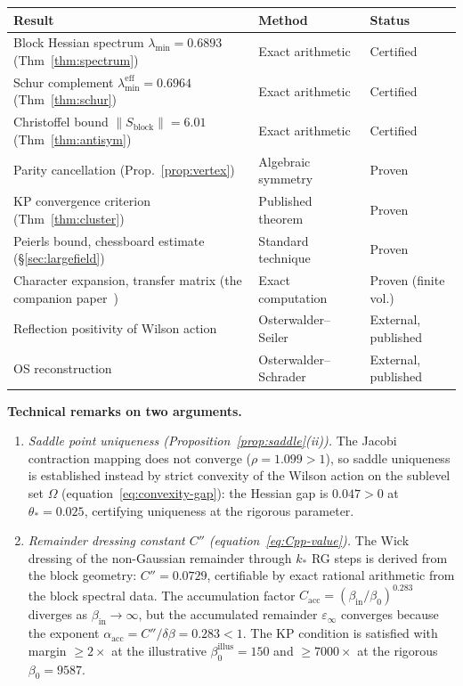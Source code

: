 \documentclass[11pt]{article}
\theoremstyle{definition}
\begin{document}
\begin{center}
\renewcommand{\arraystretch}{1.15}
\begin{tabular}{p{5.5cm}p{3cm}p{5cm}}
\toprule
\textbf{Result} & \textbf{Method} & \textbf{Status}\\
\midrule
Block Hessian spectrum
$\lambda_{\min}=0.6893$ (Thm~\ref{thm:spectrum})
& Exact arithmetic & Certified\\
Schur complement
$\lambda_{\min}^{\mathrm{eff}}=0.6964$ (Thm~\ref{thm:schur})
& Exact arithmetic & Certified\\
Christoffel bound
$\|S_{\mathrm{block}}\|=6.01$ (Thm~\ref{thm:antisym})
& Exact arithmetic & Certified\\
Parity cancellation
(Prop.~\ref{prop:vertex})
& Algebraic symmetry & Proven\\
KP convergence criterion
(Thm~\ref{thm:cluster})
& Published theorem & Proven\\
Peierls bound, chessboard estimate
(\S\ref{sec:largefield})
& Standard technique & Proven\\
Character expansion, transfer matrix
(the companion paper~\cite{companion})
& Exact computation & Proven (finite vol.)\\
Reflection positivity of Wilson action
& Osterwalder--Seiler~\cite{OS78} & External, published\\
OS reconstruction
& Osterwalder--Schrader~\cite{OS73} & External, published\\
\bottomrule
\end{tabular}
\end{center}

\medskip\noindent\textbf{Technical remarks on two arguments.}

\begin{enumerate}[label=(\roman*)]
\item \emph{Saddle point uniqueness
(Proposition~\ref{prop:saddle}(ii)).}
The Jacobi contraction mapping does not converge
($\rho=1.099>1$), so saddle uniqueness is established
instead by strict convexity of the Wilson action
on the sublevel set $\Omega$
(equation~\eqref{eq:convexity-gap}): the Hessian gap is $0.047>0$
at $\theta_*=0.025$, certifying uniqueness at the
rigorous parameter.

\item \emph{Remainder dressing constant $C''$
(equation~\eqref{eq:Cpp-value}).}
The Wick dressing of the non-Gaussian remainder
through $k_*$ RG steps is derived from the
block geometry: $C''=0.0729$, certifiable by
exact rational arithmetic from the block spectral data.
The accumulation factor
$C_{\mathrm{acc}}=(\beta_{\mathrm{in}}/\beta_0)^{0.283}$
diverges as $\beta_{\mathrm{in}}\to\infty$, but the accumulated
remainder $\varepsilon_\infty$ converges
because the exponent $\alpha_{\mathrm{acc}}
=C''/\delta\beta=0.283<1$.
The KP condition is satisfied with margin $\ge 2\times$
at the illustrative $\beta_0^{\mathrm{illus}}=150$ and $\ge 7000\times$ at the rigorous $\beta_0=9587$.
\end{enumerate}
\end{document}

